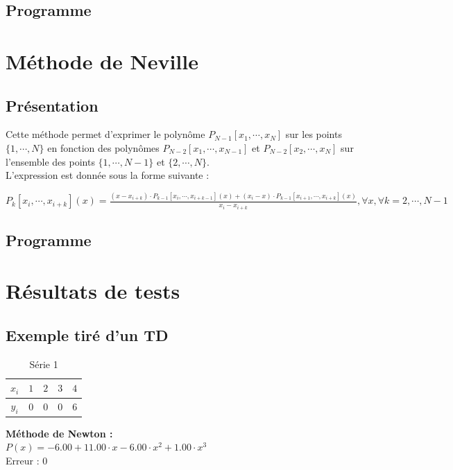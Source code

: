\documentclass{report}
\begin{document}
      \subsection{Programme}
	
    \newpage
    \section{Méthode de Neville}
      \subsection{Présentation}
	Cette méthode permet d'exprimer le polynôme $P_{N-1}[x_{1},\cdots,x_{N}]$ sur les points $\{1,\cdots,N\}$ en fonction des polynômes $P_{N-2}[x_{1},\cdots,x_{N-1}]$ et $P_{N-2}[x_{2},\cdots,x_{N}]$ sur l'ensemble des points $\{1,\cdots,N-1\}$ et $\{2,\cdots,N\}$.\\
	
	\noindent L'expression est donnée sous la forme suivante : 
	
	$P_{k}[x_{i},\cdots,x_{i+k}](x) = \frac{(x-x_{i+k}) \cdot P_{k-1}[x_{i},\cdots,x_{i+k-1}](x) + (x_{i}-x) \cdot P_{k-1}[x_{i+1},\cdots,x_{i+k}](x)}{x_{i}-x_{i+k}}, \forall x, \forall k=2,\cdots,N-1$ 
      \subsection{Programme}
	
    \newpage
    \section{Résultats de tests}
      \subsection{Exemple tiré d'un TD}
	\begin{table}[h]
	  \centering
	  \begin{tabular}{| c | c | c | c | c |}
	  \hline 
	  $x_{i}$ & $1$ & $2$ & $3$ & $4$ \\ 
	  \hline 
	  $y_{i}$ & $0$ & $0$ & $0$ & $6$ \\ 
	  \hline 
	  \end{tabular}
	  \caption{Série 1}
	  \label{inter_td3_ex3}
	\end{table}
	
	\noindent\textbf{Méthode de Newton :}\\
	$P(x)= -6.00 + 11.00 \cdot x- 6.00 \cdot x^{2}  + 1.00 \cdot x^{3} $\\
	Erreur : $0$
	\newline
	
\end{document}
